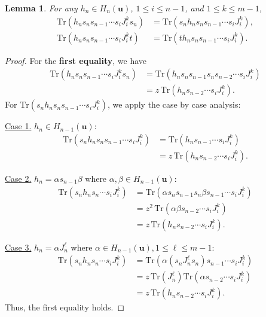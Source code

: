 \documentclass[a4paper, oneside]{amsart}
\numberwithin{equation}{section}
\newtheorem{lemma}[equation]{Lemma}
\theoremstyle{definition}
\theoremstyle{remark}
\begin{document}
\begin{lemma}\label{Lemm:JM-Typer-III}
For any $h_n \in H_n(\boldsymbol{u})$, $1 \leq i\leq n-1$, and $1 \leq k\leq m-1$,
\begin{align*}
    \mathrm{Tr}(h_n s_n s_{n-1} \cdots s_i J_i^k s_n) &=
    \mathrm{Tr}(s_n h_n s_n s_{n-1} \cdots s_i J_i^k), \\
    \mathrm{Tr}(h_n s_n s_{n-1} \cdots s_i J_i^k t) &=
     \mathrm{Tr}(t h_n s_n s_{n-1} \cdots s_i J_i^k).
\end{align*}
\end{lemma}
\begin{proof}
For the \textbf{first equality}, we have
\begin{align*}
    \mathrm{Tr}(h_n s_n s_{n-1} \cdots s_i J_i^k s_n)
    &= \mathrm{Tr}(h_n s_n s_{n-1} s_n s_{n-2} \cdots s_i J_i^k) \\
    &= z\,\mathrm{Tr}(h_n s_{n-2} \cdots s_i J_i^k).
\end{align*}
For \(\mathrm{Tr}(s_n h_n s_n s_{n-1} \cdots s_i J_i^k)\), we apply the case by case analysis:

\underline{Case 1.} \(h_n \in H_{n-1}(\boldsymbol{u})\):
\begin{align*}
    \mathrm{Tr}(s_n h_n s_n s_{n-1} \cdots s_i J_i^k)
    &= \mathrm{Tr}(h_n s_{n-1} \cdots s_i J_i^k) \\
    &= z\,\mathrm{Tr}(h_n s_{n-2} \cdots s_i J_i^k).
\end{align*}

\underline{Case 2.} \( h_n = \alpha s_{n-1} \beta \) where \( \alpha, \beta \in H_{n-1}(\boldsymbol{u}) \):
\begin{align*}
    \mathrm{Tr}(s_n h_n s_n \cdots s_i J_i^k)
    &= \mathrm{Tr}(\alpha s_n s_{n-1} s_n \beta s_{n-1} \cdots s_i J_i^k) \\
    &= z^2\,\mathrm{Tr}(\alpha \beta s_{n-2} \cdots s_i J_i^k) \\
    &= z\,\mathrm{Tr}(h_n s_{n-2} \cdots s_i J_i^k).
\end{align*}

\underline{Case 3.} $h_n = \alpha J_n^\ell$ where
$\alpha \in H_{n-1}(\boldsymbol{u}), 1 \leq \ell\leq m -1$:
\begin{align*}
    \mathrm{Tr}(s_n h_n s_n \cdots s_i J_i^k)
    &= \mathrm{Tr}(\alpha (s_n J_n^\ell s_n) s_{n-1} \cdots s_i J_i^k) \\
    &= z\,\mathrm{Tr}(J_n^\ell) \mathrm{Tr}(\alpha s_{n-2} \cdots s_i J_i^k) \\
    &= z\,\mathrm{Tr}(h_n s_{n-2} \cdots s_i J_i^k).
\end{align*}
Thus, the first equality holds.


\end{proof}
\end{document}
